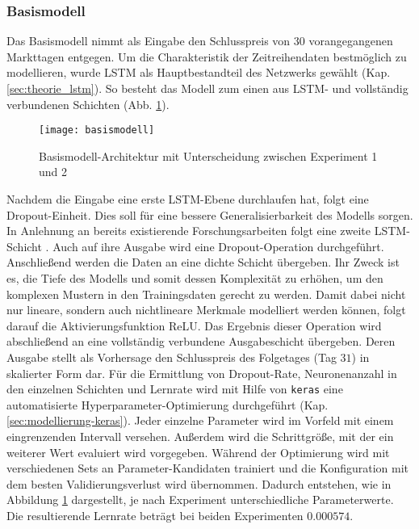 \subsubsection{Basismodell}\label{sec:modellierung_basis_goog}

Das Basismodell nimmt als Eingabe den Schlusspreis von $30$ vorangegangenen Markttagen entgegen. Um die Charakteristik der Zeitreihendaten bestmöglich zu modellieren, wurde \ac{LSTM} als Hauptbestandteil des Netzwerks gewählt (Kap. \ref{sec:theorie_lstm}). So besteht das Modell zum einen aus \ac{LSTM}- und vollständig verbundenen Schichten (Abb. \ref{fig:basismodell}). 
\begin{figure}[H]
	\centering
	\texttt{[image: basismodell]}
	\caption{Basismodell-Architektur mit Unterscheidung zwischen Experiment 1 und 2}
	\label{fig:basismodell}
\end{figure}
Nachdem die Eingabe eine erste \ac{LSTM}-Ebene durchlaufen hat, folgt eine Dropout-Einheit. Dies soll für eine bessere Generalisierbarkeit des Modells sorgen. In Anlehnung an bereits existierende Forschungsarbeiten folgt eine zweite \ac{LSTM}-Schicht \autocite[Kap. 4.2.1]{guan2020stockprice}. Auch auf ihre Ausgabe wird eine Dropout-Operation durchgeführt. Anschließend werden die Daten an eine dichte Schicht übergeben. Ihr Zweck ist es, die Tiefe des Modells und somit dessen Komplexität zu erhöhen, um den komplexen Mustern in den Trainingsdaten gerecht zu werden. Damit dabei nicht nur lineare, sondern auch nichtlineare Merkmale modelliert werden können, folgt darauf die Aktivierungsfunktion \ac{ReLU}. Das Ergebnis dieser Operation wird abschließend an eine vollständig verbundene Ausgabeschicht übergeben. Deren Ausgabe stellt als Vorhersage den Schlusspreis des Folgetages (Tag $31$) in skalierter Form dar.
Für die Ermittlung von Dropout-Rate, Neuronenanzahl in den einzelnen Schichten und Lernrate wird mit Hilfe von \texttt{keras} eine automatisierte Hyperparameter-Optimierung durchgeführt (Kap. \ref{sec:modellierung-keras}). Jeder einzelne Parameter wird im Vorfeld mit einem eingrenzenden Intervall versehen. Außerdem wird die Schrittgröße, mit der ein weiterer Wert evaluiert wird vorgegeben. Während der Optimierung wird mit verschiedenen Sets an Parameter-Kandidaten trainiert und die Konfiguration mit dem besten Validierungsverlust wird übernommen. Dadurch entstehen, wie in Abbildung \ref{fig:basismodell} dargestellt, je nach Experiment unterschiedliche Parameterwerte. Die resultierende Lernrate beträgt bei beiden Experimenten $0.000574$.



